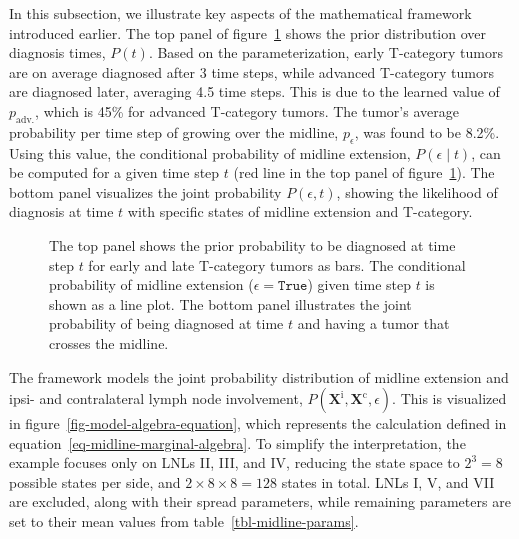 \documentclass[
  sn-mathphys-num,
]{sn-jnl}
\begin{document}
In this subsection, we illustrate key aspects of the mathematical
framework introduced earlier. The top panel of
figure~\ref{fig-model-midext-evo} shows the prior distribution over
diagnosis times, \(P(t)\). Based on the parameterization, early
T-category tumors are on average diagnosed after 3 time steps, while
advanced T-category tumors are diagnosed later, averaging 4.5 time
steps. This is due to the learned value of \(p_\text{adv.}\), which is
45\% for advanced T-category tumors. The tumor's average probability per
time step of growing over the midline, \(p_\epsilon\), was found to be
8.2\%. Using this value, the conditional probability of midline
extension, \(P(\epsilon \mid t)\), can be computed for a given time step
\(t\) (red line in the top panel of figure~\ref{fig-model-midext-evo}).
The bottom panel visualizes the joint probability \(P(\epsilon, t)\),
showing the likelihood of diagnosis at time \(t\) with specific states
of midline extension and T-category.

\begin{figure}

\centering{



}

\caption{\label{fig-model-midext-evo}The top panel shows the prior
probability to be diagnosed at time step \(t\) for early and late
T-category tumors as bars. The conditional probability of midline
extension (\(\epsilon=\texttt{True}\)) given time step \(t\) is shown as
a line plot. The bottom panel illustrates the joint probability of being
diagnosed at time \(t\) and having a tumor that crosses the midline.}

\end{figure}%

The framework models the joint probability distribution of midline
extension and ipsi- and contralateral lymph node involvement,
\(P \left( \mathbf{X}^\text{i}, \mathbf{X}^\text{c}, \epsilon \right)\).
This is visualized in figure~\ref{fig-model-algebra-equation}, which
represents the calculation defined in
equation~\ref{eq-midline-marginal-algebra}. To simplify the
interpretation, the example focuses only on LNLs II, III, and IV,
reducing the state space to \(2^3 = 8\) possible states per side, and
\(2 \times 8 \times 8 = 128\) states in total. LNLs I, V, and VII are
excluded, along with their spread parameters, while remaining parameters
are set to their mean values from table~\ref{tbl-midline-params}.
\end{document}
